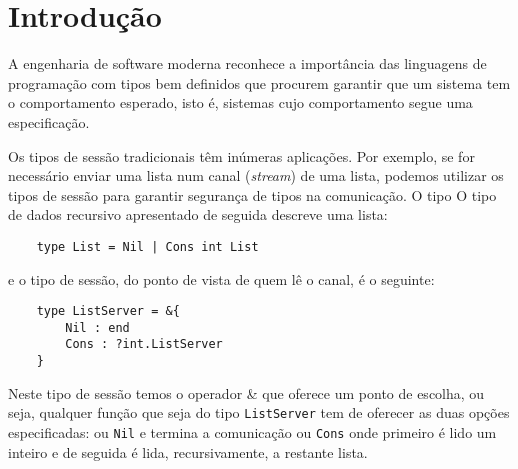 
\section{Introdução}
\label{sec:intro}

A engenharia de software moderna reconhece a importância das linguagens de programação com tipos bem definidos que procurem garantir que um sistema tem o comportamento esperado, isto é, sistemas cujo comportamento segue uma especificação.



Os tipos de sessão tradicionais têm inúmeras aplicações. Por exemplo, se for necessário enviar uma lista num canal (\textit{stream}) de uma lista, podemos utilizar os tipos de sessão para garantir segurança de tipos na comunicação. O tipo O tipo de dados recursivo apresentado de seguida descreve uma lista:
\begin{lstlisting}
	type List = Nil | Cons int List
\end{lstlisting}
e o tipo de sessão, do ponto de vista de quem lê o canal, é o seguinte:
\begin{lstlisting}
	type ListServer = &{
		Nil : end
		Cons : ?int.ListServer
	}
\end{lstlisting}

Neste tipo de sessão temos o operador \& que oferece um ponto de escolha, ou seja, qualquer função que seja do tipo \lstinline"ListServer" tem de oferecer as duas opções especificadas: ou \lstinline"Nil" e termina a comunicação ou \lstinline"Cons" onde primeiro é lido um inteiro e de seguida é lida, recursivamente, a restante lista.

